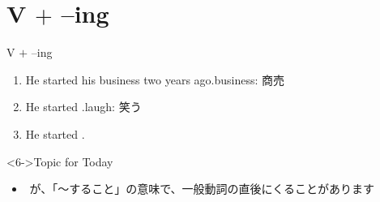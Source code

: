 \documentclass[aspectratio=169,xcolor={dvipsnames,table}]{beamer}
\begin{document}
\section{V $+$ --ing}
\begin{frame}[plain]{V $+$ --ing}
 \begin{enumerate}
  \item<1-> He started his business two years ago.\hfill{\scriptsize business: 商売}
  \item<2-> He started .\hfill{\scriptsize laugh: 笑う}
  \item<4-> He started .
 \end{enumerate}
%
\hfill{\scriptsize {}}
\begin{exampleblock}<6->{Topic for Today}
\begin{itemize}\small
 \item {}\,\,が、「〜すること」の意味で、一般動詞の直後にくることがあります
 \end{itemize}
     \end{exampleblock}
\end{frame}
\end{document}
